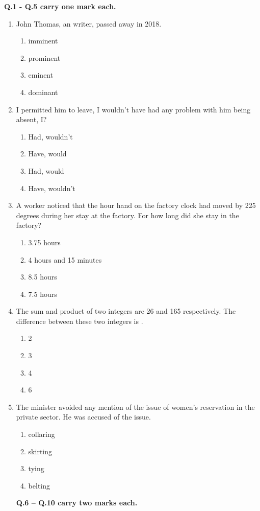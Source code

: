 \documentclass[12pt]{article}
\begin{document}
\noindent\textbf{Q.1 - Q.5 carry one mark each.}
\begin{enumerate}[label=Q.\arabic*]

\item John Thomas, an \underline{\hspace{3cm}} writer, passed away in 2018.
\begin{enumerate}
\item imminent 
\item prominent
\item eminent
\item dominant
\end{enumerate}

\item \underline{\hspace{0.5cm}} I permitted him to leave, I wouldn’t have had any problem with him being absent, \underline{\hspace{0.5cm}} I?
\begin{enumerate}
\item Had, wouldn't
\item Have, would 
\item Had, would
\item Have, wouldn't
\end{enumerate}

\item A worker noticed that the hour hand on the factory clock had moved by 225 degrees during her stay at the factory. For how long did she stay in the factory?
\begin{enumerate}
\item 3.75 hours 
\item 4 hours and 15 minutes
\item 8.5 hours 
\item 7.5 hours
\end{enumerate}

\item The sum and product of two integers are 26 and 165 respectively. The difference between these two integers is \underline{\hspace{1cm}}.
\begin{enumerate}
\item 2 \item 3 \item 4 \item  6 
\end{enumerate}


\item The minister avoided any mention of the issue of women’s reservation in the private sector. He was accused of \underline{\hspace{2cm}} the issue.
\begin{enumerate}
\item collaring \item skirting \item tying \item belting
\end{enumerate}
\textbf{Q.6 – Q.10 carry two marks each.}


\end{enumerate}
\end{document}
